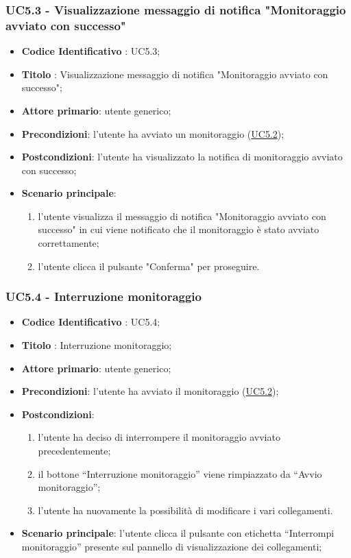 		\label{par:UC5.3}
	\subsubsection{UC5.3 - Visualizzazione messaggio di notifica "Monitoraggio avviato con successo"}	
		\begin{itemize}
			\item\textbf{Codice Identificativo} : UC5.3;
			\item\textbf{Titolo} : Visualizzazione messaggio di notifica "Monitoraggio avviato con successo";
			\item\textbf{Attore primario}: utente generico;
			\item\textbf{Precondizioni}: l'utente ha avviato un monitoraggio (\hyperref[par:UC5.2]{UC5.2});
			\item\textbf{Postcondizioni}: l'utente ha visualizzato la notifica di monitoraggio avviato con successo;
			\item\textbf{Scenario principale}:
				\begin{enumerate}
					\item l'utente visualizza il messaggio di notifica "Monitoraggio avviato con successo" in cui viene notificato che il monitoraggio è stato avviato correttamente;
					\item l'utente clicca il pulsante "Conferma" per proseguire.		
				\end{enumerate}		
		\end{itemize}
		
		\label{par:UC5.4}
	\subsubsection{UC5.4 - Interruzione monitoraggio}
		\begin{itemize}
			\item\textbf{Codice Identificativo} : UC5.4;
			\item\textbf{Titolo} : Interruzione monitoraggio;
			\item\textbf{Attore primario}: utente generico;
			\item\textbf{Precondizioni}: l'utente ha avviato il monitoraggio (\hyperref[par:UC5.2]{UC5.2});
			\item\textbf{Postcondizioni}:
				\begin{enumerate}
					\item l'utente ha deciso di interrompere il monitoraggio avviato precedentemente;
					\item il bottone “Interruzione monitoraggio” viene rimpiazzato da “Avvio monitoraggio”;
					\item l'utente ha nuovamente la possibilità di modificare i vari collegamenti.
				\end{enumerate}	
			\item\textbf{Scenario principale}: l'utente clicca il pulsante con etichetta “Interrompi monitoraggio” presente sul pannello di visualizzazione dei collegamenti;
			
		\end{itemize}


